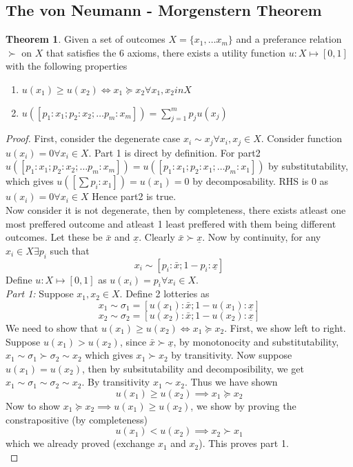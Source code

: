 \documentclass{article}
\theoremstyle{definition}
\newtheorem{theorem}{Theorem}[section]
\begin{document}
\subsection{The von Neumann - Morgenstern Theorem}
\begin{theorem}
Given a set of outcomes $X = \{x_1,\dots x_m\}$ and a preferance relation $\succ$ on $X$ that satisfies the 6 axioms, there exists a utility function $u:X\mapsto [0,1]$ with the following properties
\begin{enumerate}
	\item $u(x_1)\geq u(x_2) \iff x_1\succeq x_2 \forall x_1, x_2 in X$
	\item $u([p_1:x_1;p_2:x_2;\dots p_m:x_m]) = \sum_{j=1}^m p_j u(x_j)$
\end{enumerate}
\end{theorem}
\begin{proof}
First, consider the degenerate case $x_i \sim x_j \forall x_i,x_j \in X$. Consider function $u(x_i) = 0 \forall x_i \in X$. Part 1 is direct by definition. For part2 $u([p_1:x_1;p_2:x_2;\dots p_m:x_m]) = u([p_1:x_1;p_2:x_1;\dots p_m:x_1])$ by substitutability, which gives $u([\sum p_i: x_1]) = u(x_1) = 0$ by decomposability. RHS is $0$ as $u(x_i) = 0 \forall x_i \in X$ Hence part2 is true.\\

Now consider it is not degenerate, then by completeness, there exists atleast one most preffered outcome and atleast 1 least preffered with them being different outcomes. Let these be $\bar{x}$ and $\underline{x}$. Clearly $\bar{x}\succ \underline{x}$. Now by continuity, for any $x_i \in X \exists p_i$ such that $$x_i \sim [p_i:\bar{x}; 1-p_i:\underline{x}]$$ Define $u:X\mapsto [0,1]$ as $u(x_i) = p_i \forall x_i\in X$.\\

\textit{Part 1:} Suppose $x_1, x_2 \in X$. Define 2 lotteries as $$x_1 \sim \sigma_1 = [u(x_1):\bar{x}; 1-u(x_1):\underline{x}]$$
$$x_2 \sim \sigma_2 = [u(x_2):\bar{x}; 1-u(x_2):\underline{x}]$$
We need to show that $u(x_1)\geq u(x_2) \iff x_1\succeq x_2$. First, we show left to right. Suppose $u(x_1)>u(x_2)$, since $\bar{x}\succ \underline{x}$, by monotonocity and substitutability, $x_1\sim \sigma_1 \succ \sigma_2 \sim x_2$ which gives $x_1\succ x_2$ by transitivity. Now suppose $u(x_1) = u(x_2)$, then by subsitutability and decomposibility, we get $x_1\sim \sigma_1 \sim \sigma_2 \sim x_2$. By transitivity $x_1 \sim x_2$. Thus we have shown $$u(x_1) \geq u(x_2) \implies x_1 \succeq x_2$$ Now to show $x_1\succeq x_2 \implies u(x_1) \geq u(x_2)$, we show by proving the constrapositive (by completeness) $$u(x_1)<u(x_2)\implies x_2 \succ x_1$$ which we already proved (exchange $x_1$ and $x_2$). This proves part 1.\\


\end{proof}
\end{document}
